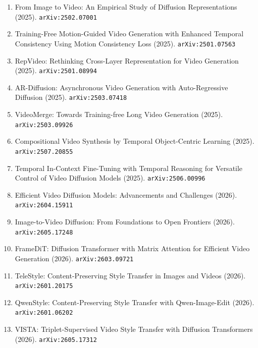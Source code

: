 \documentclass[11pt]{article}
\begin{document}
\begin{enumerate}
  \item From Image to Video: An Empirical Study of Diffusion Representations (2025). \texttt{arXiv:2502.07001}
  \item Training-Free Motion-Guided Video Generation with Enhanced Temporal
  Consistency Using Motion Consistency Loss (2025). \texttt{arXiv:2501.07563}
  \item RepVideo: Rethinking Cross-Layer Representation for Video Generation (2025). \texttt{arXiv:2501.08994}
  \item AR-Diffusion: Asynchronous Video Generation with Auto-Regressive
  Diffusion (2025). \texttt{arXiv:2503.07418}
  \item VideoMerge: Towards Training-free Long Video Generation (2025). \texttt{arXiv:2503.09926}
  \item Compositional Video Synthesis by Temporal Object-Centric Learning (2025). \texttt{arXiv:2507.20855}
  \item Temporal In-Context Fine-Tuning with Temporal Reasoning for Versatile Control of Video Diffusion Models (2025). \texttt{arXiv:2506.00996}
  \item Efficient Video Diffusion Models: Advancements and Challenges (2026). \texttt{arXiv:2604.15911}
  \item Image-to-Video Diffusion: From Foundations to Open Frontiers (2026). \texttt{arXiv:2605.17248}
  \item FrameDiT: Diffusion Transformer with Matrix Attention for Efficient Video Generation (2026). \texttt{arXiv:2603.09721}
  \item TeleStyle: Content-Preserving Style Transfer in Images and Videos (2026). \texttt{arXiv:2601.20175}
  \item QwenStyle: Content-Preserving Style Transfer with Qwen-Image-Edit (2026). \texttt{arXiv:2601.06202}
  \item VISTA: Triplet-Supervised Video Style Transfer with Diffusion Transformers (2026). \texttt{arXiv:2605.17312}
\end{enumerate}
\end{document}
